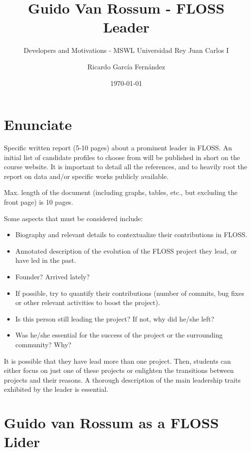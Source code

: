 \documentclass[11pt]{scrartcl}
\title{\textbf{Guido Van Rossum - FLOSS Leader}}
\subtitle{Developers and Motivations - MSWL Universidad Rey Juan Carlos I}
\author{Ricardo García Fernández}
\date{\today}
\begin{document}
\maketitle

\newpage

\tableofcontents

\newpage

\section{Enunciate}

Specific written report (5-10 pages) about a prominent leader in FLOSS. An initial list of candidate profiles to choose from will be published in short on the course website. It is important to detail all the references, and to heavily root the report on data and/or specific works publicly available.

Max. length of the document (including graphs, tables, etc., but excluding the front page) is 10 pages.

Some aspects that must be considered include:
\begin{itemize}
    \item Biography and relevant details to contextualize their contributions in FLOSS.
    \item Annotated description of the evolution of the FLOSS project they lead, or have led in the past.
    \item Founder? Arrived lately?
    \item If possible, try to quantify their contributions (number of commits, bug fixes or other relevant activities to boost the project).
    \item Is this person still leading the project? If not, why did he/she left?
    \item Was he/she essential for the success of the project or the surrounding community? Why?
\end{itemize}

It is possible that they have lead more than one project. Then, students can either focus on just one of these projects or enlighten the transitions between projects and their reasons. A thorough description of the main leadership traits exhibited by the leader is essential.

\section{Guido van Rossum as a FLOSS Lider}
\end{document}
